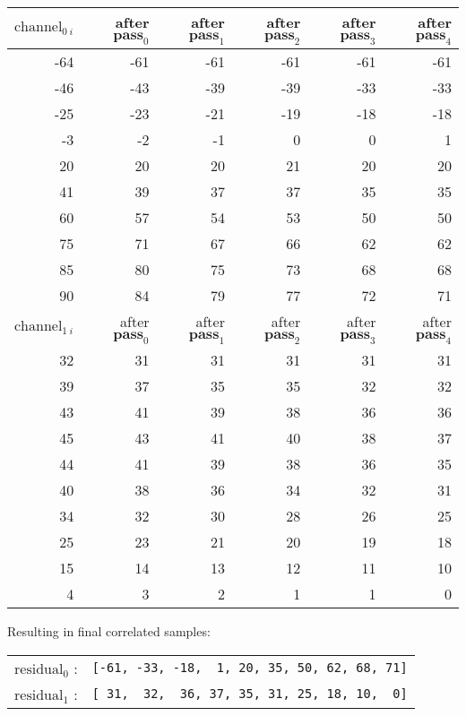 {
  \begin{tabular}{|r|r|r|r|r|r|}
    \hline
    $\text{channel}_{0~i}$ &
    after $\textbf{pass}_0$ &
    after $\textbf{pass}_1$ &
    after $\textbf{pass}_2$ &
    after $\textbf{pass}_3$ &
    after $\textbf{pass}_4$ \\
    \hline
    -64 & -61 & -61 & -61 & -61 & -61 \\
    -46 & -43 & -39 & -39 & -33 & -33 \\
    -25 & -23 & -21 & -19 & -18 & -18 \\
    -3 & -2 & -1 & 0 & 0 & 1 \\
    20 & 20 & 20 & 21 & 20 & 20 \\
    41 & 39 & 37 & 37 & 35 & 35 \\
    60 & 57 & 54 & 53 & 50 & 50 \\
    75 & 71 & 67 & 66 & 62 & 62 \\
    85 & 80 & 75 & 73 & 68 & 68 \\
    90 & 84 & 79 & 77 & 72 & 71 \\
    \hline
    \hline
    $\text{channel}_{1~i}$ &
    after $\textbf{pass}_0$ &
    after $\textbf{pass}_1$ &
    after $\textbf{pass}_2$ &
    after $\textbf{pass}_3$ &
    after $\textbf{pass}_4$ \\
    \hline
    32 & 31 & 31 & 31 & 31 & 31 \\
    39 & 37 & 35 & 35 & 32 & 32 \\
    43 & 41 & 39 & 38 & 36 & 36 \\
    45 & 43 & 41 & 40 & 38 & 37 \\
    44 & 41 & 39 & 38 & 36 & 35 \\
    40 & 38 & 36 & 34 & 32 & 31 \\
    34 & 32 & 30 & 28 & 26 & 25 \\
    25 & 23 & 21 & 20 & 19 & 18 \\
    15 & 14 & 13 & 12 & 11 & 10 \\
    4 & 3 & 2 & 1 & 1 & 0 \\
    \hline
  \end{tabular}
}
\par
\noindent
Resulting in final correlated samples:
\newline
\begin{tabular}{rr}
$\text{residual}_0$ : & \texttt{[-61,~-33,~-18,~~1,~20,~35,~50,~62,~68,~71]} \\
$\text{residual}_1$ : & \texttt{[~31,~~32,~~36,~37,~35,~31,~25,~18,~10,~~0]} \\
\end{tabular}

